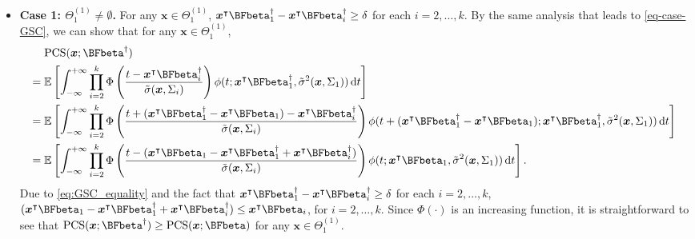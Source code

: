 \documentclass[ijoc,nonblindrev]{informs3}
\def\E{\mathbb{E}}
\def\ud{\mathrm{d}}
\def\bx{{\bm x}}
\def\PCS{\mathrm{PCS}}
\begin{document}
\begin{itemize}
\item
\textbf{Case 1: $\Theta_1^{(1)} \neq \emptyset$.}
For any $\bx \in \Theta_1^{(1)}$, $\bx^\intercal \BFbeta_1^\dagger - \bx^\intercal \BFbeta_i^\dagger \geq \delta$ for each $i=2,\ldots,k$.
By the same analysis that leads to \eqref{eq-case-GSC}, we can show that for any $\bx \in \Theta_1^{(1)}$,
\begin{align*}
&\PCS(\bx;\BFbeta^\dagger)\\
={}& \E \left[ \int_{-\infty}^{+\infty} \prod_{i=2}^k \Phi \left( \frac{t - \bx^\intercal \BFbeta_i^\dagger}{\tilde\sigma(\bx,\Sigma_i)} \right)\phi (t; \bx^\intercal \BFbeta_1^\dagger, \tilde\sigma^2(\bx,\Sigma_1))\,\ud t \right]\\
={}&\E \left[ \int_{-\infty}^{+\infty} \prod_{i=2}^k \Phi \left( \frac{t +(\bx^\intercal \BFbeta_1^\dagger - \bx^\intercal \BFbeta_1) - \bx^\intercal \BFbeta_i^\dagger}{\tilde\sigma(\bx,\Sigma_i)} \right)\phi (t+(\bx^\intercal \BFbeta_1^\dagger - \bx^\intercal \BFbeta_1); \bx^\intercal \BFbeta_1^\dagger, \tilde\sigma^2(\bx,\Sigma_1))\,\ud t \right]\\
={}&\E \left[ \int_{-\infty}^{+\infty} \prod_{i=2}^k \Phi \left( \frac{t -(\bx^\intercal \BFbeta_1 - \bx^\intercal \BFbeta_1^\dagger + \bx^\intercal \BFbeta_i^\dagger) }{\tilde\sigma(\bx,\Sigma_i)} \right)\phi (t; \bx^\intercal \BFbeta_1, \tilde\sigma^2(\bx,\Sigma_1))\,\ud t \right].
\end{align*}
Due to \eqref{eq:GSC_equality} and the fact that $\bx^\intercal \BFbeta_1^\dagger - \bx^\intercal \BFbeta_i^\dagger \geq \delta$ for each $i=2,\ldots,k$,
$(\bx^\intercal \BFbeta_1 - \bx^\intercal \BFbeta_1^\dagger + \bx^\intercal \BFbeta_i^\dagger) \leq \bx^\intercal \BFbeta_i$, for $i=2,\ldots,k$.
Since $\Phi(\cdot)$ is an increasing function, it is straightforward to see that $\PCS(\bx;\BFbeta^\dagger) \geq \PCS(\bx;\BFbeta)$ for any $\bx\in\Theta_1^{(1)}$.


\end{itemize}
\end{document}
